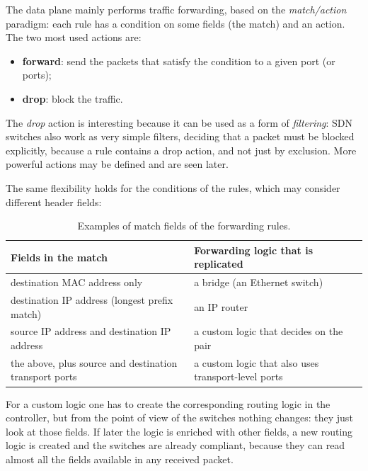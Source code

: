 The data plane mainly performs traffic forwarding, based on the \emph{match/action} paradigm: each rule has a condition on some fields (the match) and an action. The two most used actions are:

\begin{itemize}
\item \textbf{forward}: send the packets that satisfy the condition to a given port (or ports);
\item \textbf{drop}: block the traffic.
\end{itemize}

The \emph{drop} action is interesting because it can be used as a form of \emph{filtering}: SDN switches also work as very simple filters, deciding that a packet must be blocked explicitly, because a rule contains a drop action, and not just by exclusion. More powerful actions may be defined and are seen later.

The same flexibility holds for the conditions of the rules, which may consider different header fields:

\begin{table}[h]
\centering
\renewcommand{\arraystretch}{1.25}
\begin{tabular}{@{}>{\raggedright\arraybackslash}p{6.3cm}>{\raggedright\arraybackslash}p{6.5cm}@{}}
\toprule
\textbf{Fields in the match} & \textbf{Forwarding logic that is replicated} \\
\midrule
destination MAC address only & a bridge (an Ethernet switch) \\
destination IP address (longest prefix match) & an IP router \\
source IP address and destination IP address & a custom logic that decides on the pair \\
the above, plus source and destination transport ports & a custom logic that also uses transport-level ports \\
\bottomrule
\end{tabular}
\caption{Examples of match fields of the forwarding rules.}
\end{table}

For a custom logic one has to create the corresponding routing logic in the controller, but from the point of view of the switches nothing changes: they just look at those fields. If later the logic is enriched with other fields, a new routing logic is created and the switches are already compliant, because they can read almost all the fields available in any received packet.

